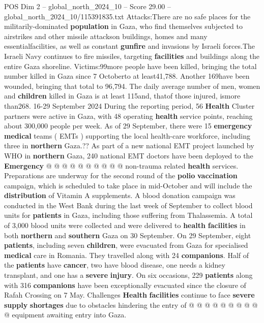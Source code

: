 \begin{textsample}{POS Dim 2 – global\_north\_2024\_10 – Score 29.00 – global\_north\_2024\_10/115391835.txt}  \label{ex:f2_pos_348}
Attacks:There are no safe places for the militarily-dominated \textbf{population} in Gaza, who find themselves subjected to airstrikes and other missile attackson buildings, homes and many essentialfacilities, as well as constant \textbf{gunfire} and invasions by Israeli forces.The Israeli Navy continues to fire missiles, targeting \textbf{facilities} and buildings along the entire Gaza shoreline.
Victims:99more people have been killed, bringing the total number killed in Gaza since 7 Octoberto at least41,788.
Another 169have been wounded, bringing that total to 96,794.
The daily average number of men, women and \textbf{children} killed in Gaza is at least 115and, thatof those injured, ismore than268. 16-29 September 2024 During the reporting period, 56 \textbf{Health} Cluster partners were active in Gaza, with 48 operating \textbf{health} service points, reaching about 300,000 people per week.
As of 29 September, there were 15 \textbf{emergency} \textbf{medical} teams ( EMTs ) supporting the local health-care workforce, including three in \textbf{northern} Gaza.??
As part of a new national EMT project launched by WHO in \textbf{northern} Gaza, 240 national EMT doctors have been deployed to the \textbf{Emergency} @ @ @ @ @ @ @ @ @ @ non-trauma related \textbf{health} services.
Preparations are underway for the second round of the \textbf{polio} \textbf{vaccination} campaign, which is scheduled to take place in mid-October and will include the \textbf{distribution} of Vitamin A supplements.
A blood donation campaign was conducted in the West Bank during the last week of September to collect blood units for \textbf{patients} in Gaza, including those suffering from Thalassemia.
A total of 3,000 blood units were collected and were delivered to \textbf{health} \textbf{facilities} in both \textbf{northern} and \textbf{southern} Gaza on 30 September.
On 29 September, eight \textbf{patients}, including seven \textbf{children}, were evacuated from Gaza for specialised \textbf{medical} care in Romania.
They travelled along with 24 \textbf{companions}.
Half of the \textbf{patients} have \textbf{cancer}, two have blood disease, one needs a kidney transplant, and one has a \textbf{severe} \textbf{injury}.
On six occasions, 229 \textbf{patients} along with 316 \textbf{companions} have been exceptionally evacuated since the closure of Rafah Crossing on 7 May.
Challenges \textbf{Health} \textbf{facilities} continue to face \textbf{severe} \textbf{supply} \textbf{shortages} due to obstacles hindering the entry of @ @ @ @ @ @ @ @ @ @ equipment awaiting entry into Gaza.

\end{textsample}
